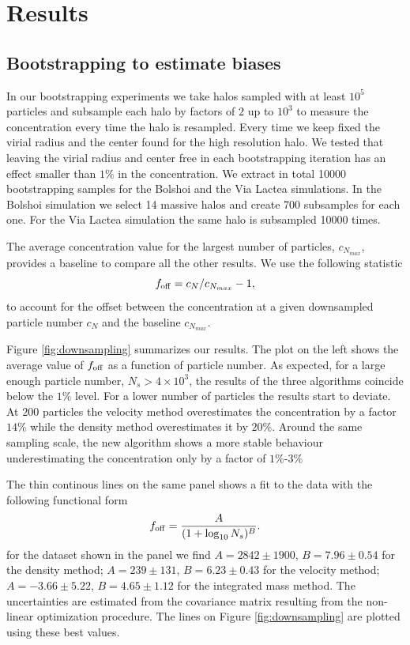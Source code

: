 \documentclass{emulateapj}
\begin{document}
\section{Results}
\label{sec:results}

\subsection{Bootstrapping to estimate biases}
\label{sec:bootstrapping}

In our bootstrapping experiments we take halos sampled with at least
$10^{5}$ particles and subsample each halo by factors of $2$ up to
$10^{3}$ to measure the concentration every time the halo is
resampled. 
Every time we keep fixed the virial radius and the center found for
the high resolution halo.
We tested that leaving the virial radius and center free in each
bootstrapping iteration has an effect smaller than $1\%$ in the
concentration. 
We extract in total 10000 bootstrapping samples for the Bolshoi
and the Via Lactea simulations.
In the Bolshoi simulation we select 14 massive halos and create 700
subsamples for each one.  
For the Via Lactea simulation the same halo is subsampled 10000
times. 

The average concentration value for the largest number of particles,
$c_{N_{max}}$, provides a baseline to compare all the other results.  
We use the following statistic
\begin{equation}
f_{\rm off} = c_{N} / c_{N_{max}} - 1,
\label{eq:f_off}
\end{equation}
to account for the offset between the concentration at a given
downsampled particle number $c_{N}$ and the baseline $c_{N_{max}}$.


Figure \ref{fig:downsampling} summarizes our results.  
The plot on the left shows the average value of $f_{\rm off}$ as a
function of particle number.  
As expected, for a large enough particle number, $N_{s}>4\times 10^3$,
the results of the three algorithms coincide below the $1\%$ level.
For a lower number of particles the results start to deviate.
At $200$ particles the velocity method overestimates the concentration
by a factor $14\%$ while the density method overestimates it by $20\%$.
Around the same sampling scale, the new algorithm shows a more stable
behaviour underestimating the concentration only by a factor of
$1\%$-$3\%$


The thin continous lines on the same panel shows a fit to the data
with the following functional form 
\begin{equation}
f_{\rm off} = \frac{A}{(1+\log_{10}N_s)^{B}}.
\label{eq:f_off_fit}
\end{equation} 
for the dataset shown in the panel we find $A=2842\pm 1900$,
$B=7.96\pm 0.54$ for the density method; $A=239\pm 131$,
$B=6.23\pm 0.43$ for the velocity method; $A=-3.66\pm 5.22$,
$B=4.65\pm 1.12$ for the integrated mass method.
The uncertainties are estimated from the covariance  matrix resulting
from the non-linear optimization procedure. The lines on Figure
\ref{fig:downsampling} are plotted using these best values.  
\end{document}
